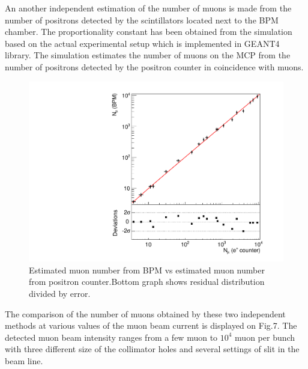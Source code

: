\documentclass[preprint,3p,twocolumn]{elsarticle}
\begin{document}
An another independent estimation of the number of muons is made from the number of positrons detected by the scintillators located next to the BPM chamber. The proportionality constant has been obtained from the simulation based on the actual experimental setup which is implemented in GEANT4 library\cite{geant4}. 
The simulation estimates the number of muons on the MCP from the number of positrons detected by the positron counter in coincidence with muons. 
\begin{figure}[tb]
\begin{minipage}[t]{60mm}
\includegraphics[width=1.3\textwidth, height=1.3\textwidth]{figure/lin.pdf}
\end{minipage}
\caption{Estimated muon number from BPM vs estimated muon number from positron counter.Bottom graph shows residual distribution divided by error.}

	\label{fig:muvsmu}
\end{figure}

The comparison of the number of muons obtained by these two independent methods at various values of the muon beam current is displayed on Fig.7. The detected muon beam intensity ranges from a few muon to $10^{4}$ muon per bunch with three different size of the collimator holes and several settings of slit in the beam line.
\end{document}
